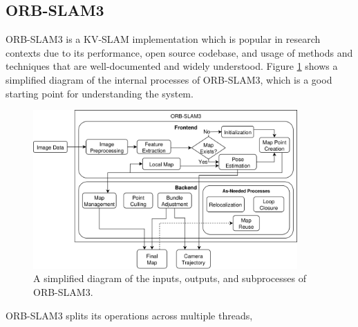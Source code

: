 \subsection{ORB-SLAM3}

ORB-SLAM3 is a KV-SLAM implementation which is popular in research contexts due to its performance, open source codebase, and usage of methods and techniques that are well-documented and widely understood. Figure \ref{fig:orb-slam3} shows a simplified diagram of the internal processes of ORB-SLAM3, which is a good starting point for understanding the system.

\begin{figure}[!ht]
    \centering
    \includegraphics[width=0.9\textwidth]{resources/orb-slam3.png}
    \caption[Simplified ORB-SLAM3 Operational Diagram]{A simplified diagram of the inputs, outputs, and subprocesses of ORB-SLAM3.}
    \label{fig:orb-slam3}
\end{figure}

ORB-SLAM3 splits its operations across multiple threads, 